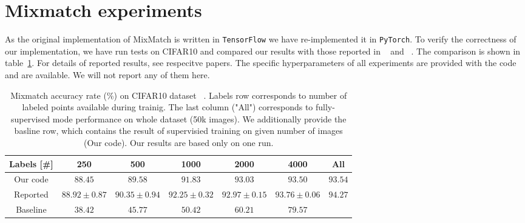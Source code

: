 \section{Mixmatch experiments}
As the original implementation of MixMatch is written in \texttt{TensorFlow} we have re-implemented it in \texttt{PyTorch}. To verify the correctness
 of our implementation, we have run tests on CIFAR10 and compared our results with those reported in ~\cite{mixmatch-2019} and ~\cite{wide-resnet-2017}. The 
comparison is shown in table~\ref{tab:mixmatch-cifar10}. For details of reported results, see respecitve papers. 
The specific hyperparameters of all experiments are provided with the code and are available. We will not report any of them here.
 
\begin{table}[tbh]
    \begin{tabular}{|c|c|c|c|c|c|c|}
    \hline
    Labels [\#]  & 250 & 500 & 1000 & 2000 & 4000 & All \\
    \hline
    Our code & $88.45$ & $89.58$& $91.83$ & $93.03$ & $93.50$ & $93.54$\\
    \hline
    Reported & $88.92\pm0.87$ & $90.35\pm0.94$ & $92.25\pm0.32$ & $92.97\pm0.15$ & $93.76\pm 0.06$ & $94.27$\\
    \hline 
    Baseline & $38.42$ & $45.77$ & $50.42$ & $60.21$ & $79.57$ &  \\
    \hline
    \end{tabular}
    \caption[Mixmatch accuracy on CIFAR10]{Mixmatch accuracy rate (\%) on CIFAR10 dataset ~\cite{cifar10-2009}. Labels row corresponds to number of labeled points available during trainig. 
    The last column ("All") corresponds to fully-supervised mode performance on whole dataset (50k images).
    We additionally provide the basline row, which contains the result of supervisied training on given number of images (Our code).
    Our results are based only on one run.}
    \label{tab:mixmatch-cifar10}
\end{table}

